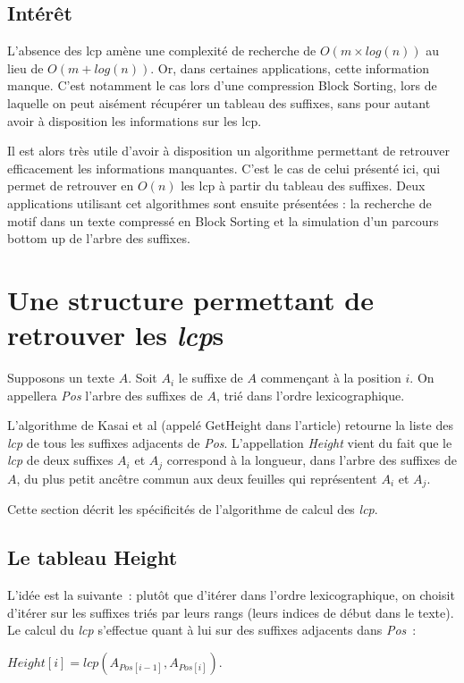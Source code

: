 \documentclass[a4paper,11pt]{article}
\begin{document}
\subsection{Intérêt}
\label{sec:interest}


L'absence des lcp amène une complexité de recherche de $O(m \times log(n))$
au lieu de $O(m+log(n))$. Or, dans certaines applications, cette
information manque. C'est notamment le cas lors d'une compression
Block Sorting, lors de laquelle on peut aisément récupérer un tableau
des suffixes, sans pour autant avoir à disposition les informations
sur les lcp.

Il est alors très utile d'avoir à disposition un algorithme permettant
de retrouver efficacement les informations manquantes. C'est le cas de
celui présenté ici, qui permet de retrouver en $O(n)$ les lcp à
partir du tableau des suffixes. Deux applications utilisant cet
algorithmes sont ensuite présentées : la recherche de motif dans un
texte compressé en Block Sorting et la simulation d'un parcours bottom
up de l'arbre des suffixes.


\section{Une structure permettant de retrouver les \textit{lcp}s}
\label{sec:heightstruct}

Supposons un texte $A$. Soit $A_{i}$ le suffixe de $A$ commençant à la
position $i$. On appellera \textit{Pos} l'arbre des suffixes de $A$,
trié dans l'ordre lexicographique.

L'algorithme de Kasai et al (appelé GetHeight dans l'article) retourne
la liste des \textit{lcp} de tous les suffixes adjacents de
\textit{Pos}. L'appellation \textit{Height} vient du fait que le
\textit{lcp} de deux suffixes $A_i$ et $A_j$ correspond à la longueur,
dans l'arbre des suffixes de $A$, du plus petit ancêtre commun aux
deux feuilles qui représentent $A_i$ et $A_j$.

Cette section décrit les spécificités de l'algorithme de calcul des
\textit{lcp}.


\subsection{Le tableau Height}
\label{sec:struct}


L'idée est la suivante~: plutôt que d'itérer dans l'ordre
lexicographique, on choisit d'itérer sur les suffixes triés par leurs
rangs (leurs indices de début dans le texte). Le calcul du
\textit{lcp} s'effectue quant à lui sur des suffixes adjacents dans
\textit{Pos}~:
\begin{center}$\mathit{Height}[i] = \mathit{lcp}(A_{\mathit{Pos}[i-1]}, A_{\mathit{Pos}[i]})$.\end{center}
\end{document}
